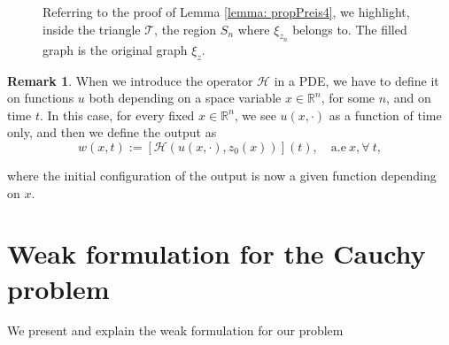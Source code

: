 \documentclass[12pt]{article}
\newcommand{\R}{\mathbb{R}}
\newcommand{\HM}{\mathcal{H}}
\newcommand{\T}{\mathcal{T}}
\newcommand{\1}{\mathds{1}}
\theoremstyle{definition}
\newtheorem{rmk}[teo]{Remark}
\begin{document}
    \begin{figure}
        \centering
       
        \caption{Referring to the proof of Lemma \ref{lemma: propPreis4}, we highlight, inside the triangle $\T$, the region $S_n$ where $\xi_{z_n}$ belongs to. The filled graph is the original  graph $\xi_z$.}
         \label{fig: regioneSn}
    \end{figure}

\begin{rmk}\label{rmk: state}
When we introduce the operator $\HM$ in a PDE, we have to define it on functions $u$ both depending on a space variable $x\in\R^n$, for some $n$, and on time $t$. In this case, for every fixed $x\in\R^n$, we see $u(x,\cdot)$ as a function of time only, and then we define the output as \begin{equation}
     w(x,t):= [\HM(u(x,\cdot),z_0(x))](t), \quad \text{a.e}\ x, \forall\ t,
\end{equation} 

\noindent
where the initial configuration of the output is now a given function depending on $x$.
\end{rmk}
    

\section{Weak formulation for the Cauchy problem}\label{S3}

We present and explain the weak formulation for our problem
\end{document}
